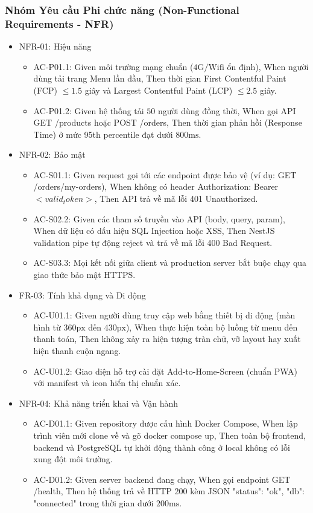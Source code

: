 \documentclass[english,12pt,a4paper]{book}
\begin{document}
\subsubsection{Nhóm Yêu cầu Phi chức năng (Non-Functional Requirements - NFR)}
\begin{itemize}
	\item NFR-01: Hiệu năng 
	\begin{itemize}[]
		\item AC-P01.1: Given môi trường mạng chuẩn ($4\text{G} / \text{Wifi}$ ổn định), When người dùng tải trang Menu lần đầu, Then thời gian First Contentful Paint (FCP) $\le 1.5$ giây và Largest Contentful Paint (LCP) $\le 2.5$ giây.
		\item  AC-P01.2: Given hệ thống tải $50$ người dùng đồng thời, When gọi API GET /products hoặc POST /orders, Then thời gian phản hồi (Response Time) ở mức 95th percentile đạt dưới $800\text{ms}$.  
	\end{itemize}
	\item NFR-02: Bảo mật 
	\begin{itemize}[]
		\item AC-S01.1: Given request gọi tới các endpoint được bảo vệ (ví dụ: GET /orders/my-orders), When không có header Authorization: Bearer $<valid_token>$, Then API trả về mã lỗi 401 Unauthorized.
		\item  AC-S02.2: Given các tham số truyền vào API (body, query, param), When dữ liệu có dấu hiệu SQL Injection hoặc XSS, Then NestJS validation pipe tự động reject và trả về mã lỗi 400 Bad Request.
		\item AC-S03.3: Mọi kết nối giữa client và production server bắt buộc chạy qua giao thức bảo mật HTTPS.
	\end{itemize}
	\item FR-03: Tính khả dụng và Di động 
	\begin{itemize}[]
		\item AC-U01.1: Given người dùng truy cập web bằng thiết bị di động (màn hình từ $360\text{px}$ đến $430\text{px}$), When thực hiện toàn bộ luồng từ menu đến thanh toán, Then không xảy ra hiện tượng tràn chữ, vỡ layout hay xuất hiện thanh cuộn ngang. 
		\item  AC-U01.2: Giao diện hỗ trợ cài đặt Add-to-Home-Screen (chuẩn PWA) với manifest và icon hiển thị chuẩn xác.
	\end{itemize}
	\item NFR-04: Khả năng triển khai và Vận hành
	\begin{itemize}[]
		\item AC-D01.1: Given repository được cấu hình Docker Compose, When lập trình viên mới clone về và gõ docker compose up, Then toàn bộ frontend, backend và PostgreSQL tự khởi động thành công ở local không có lỗi xung đột môi trường.
		\item  AC-D01.2: Given server backend đang chạy, When gọi endpoint GET /health, Then hệ thống trả về HTTP 200 kèm JSON {"status": "ok", "db": "connected"} trong thời gian dưới $200\text{ms}$. 
	\end{itemize}
\end{itemize}
\end{document}
